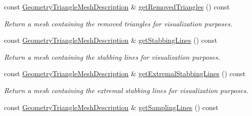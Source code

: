 \begin{DoxyCompactItemize}
\item 
\mbox{\label{classvisilib_1_1_helper_visual_debugger_a93e8bb815b4b7cc2e6816c26664d431a}} 
const \mbox{\hyperlink{structvisilib_1_1_geometry_triangle_mesh_description}{Geometry\+Triangle\+Mesh\+Description}} \& \mbox{\hyperlink{classvisilib_1_1_helper_visual_debugger_a93e8bb815b4b7cc2e6816c26664d431a}{get\+Removed\+Triangles}} () const
\begin{DoxyCompactList}\small\item\em Return a mesh containing the removed triangles for visualization purposes. \end{DoxyCompactList}\item 
\mbox{\label{classvisilib_1_1_helper_visual_debugger_a0c7ea51d50ca6a422326def264f97407}} 
const \mbox{\hyperlink{structvisilib_1_1_geometry_triangle_mesh_description}{Geometry\+Triangle\+Mesh\+Description}} \& \mbox{\hyperlink{classvisilib_1_1_helper_visual_debugger_a0c7ea51d50ca6a422326def264f97407}{get\+Stabbing\+Lines}} () const
\begin{DoxyCompactList}\small\item\em Return a mesh containing the stabbing lines for visualization purposes. \end{DoxyCompactList}\item 
\mbox{\label{classvisilib_1_1_helper_visual_debugger_a03fadbe9593e26b7db63ceb31ed333cc}} 
const \mbox{\hyperlink{structvisilib_1_1_geometry_triangle_mesh_description}{Geometry\+Triangle\+Mesh\+Description}} \& \mbox{\hyperlink{classvisilib_1_1_helper_visual_debugger_a03fadbe9593e26b7db63ceb31ed333cc}{get\+Extremal\+Stabbing\+Lines}} () const
\begin{DoxyCompactList}\small\item\em Return a mesh containing the extremal stabbing lines for visualization purposes. \end{DoxyCompactList}\item 
\mbox{\label{classvisilib_1_1_helper_visual_debugger_ae245f0ee5073f39aeab7c3d1fe2c641d}} 
const \mbox{\hyperlink{structvisilib_1_1_geometry_triangle_mesh_description}{Geometry\+Triangle\+Mesh\+Description}} \& \mbox{\hyperlink{classvisilib_1_1_helper_visual_debugger_ae245f0ee5073f39aeab7c3d1fe2c641d}{get\+Sampling\+Lines}} () const

\end{DoxyCompactItemize}
